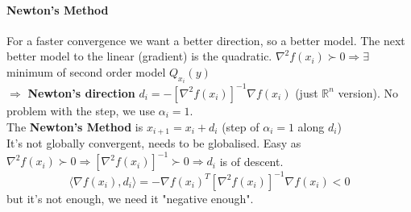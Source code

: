 \documentclass[10pt]{report}
\begin{document}
\paragraph{Newton's Method} For a faster convergence we want a better direction, so a better model. The next better model to the linear (gradient) is the quadratic. $\nabla^2 f(x_i)\succ 0 \Rightarrow \exists$ minimum of second order model $Q_{x_i}(y)$\\$\Rightarrow$ \textbf{Newton's direction} $d_i = -[\nabla^2 f(x_i)]^{-1}\nabla f(x_i)$ (just $\mathbb{R}^n$ version). No problem with the step, we use $\alpha_i = 1$.\\
The \textbf{Newton's Method} is $x_{i+1} = x_i + d_i$ (step of $\alpha_i = 1$ along $d_i$)\\
It's not globally convergent, needs to be globalised. Easy as $\nabla^2 f(x_i) \succ 0 \Rightarrow [\nabla^2 f(x_i)]^{-1} \succ 0 \Rightarrow d_i$ is of descent.
$$\langle \nabla f(x_i), d_i\rangle = -\nabla f(x_i)^T[\nabla^2f(x_i)]^{-1}\nabla f(x_i) < 0$$
but it's not enough, we need it "negative enough".
\end{document}
